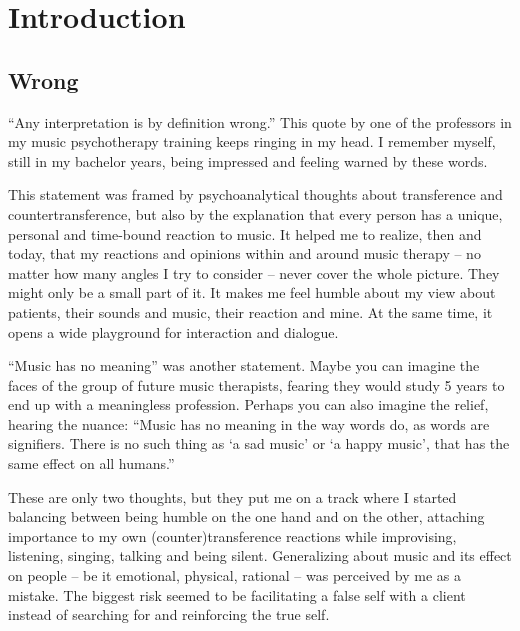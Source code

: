 \documentclass[authordate, empirical]{jote-new-article}
\author[1]{\mbox{Nele Fiers\orcid{0000-0002-8394-8598}}}
\affil[1]{Kliniek Sint-Jozef Pittem - Muze op maat}
\begin{document}
\begin{frontmatter}
  \maketitle
  \begin{abstract}
    \printabstracttext
  \end{abstract}
\end{frontmatter}


\section{Introduction}
\subsection{Wrong}

“Any interpretation is by definition wrong.” This quote by one of the professors in my music psychotherapy training keeps ringing in my head. I remember myself, still in my bachelor years, being impressed and feeling warned by these words.



This statement was framed by psychoanalytical thoughts about transference and countertransference, but also by the explanation that every person has a unique, personal and time-bound reaction to music. It helped me to realize, then and today, that my reactions and opinions within and around music therapy -- no matter how many angles I try to consider -- never cover the whole picture. They might only be a small part of it. It makes me feel humble about my view about patients, their sounds and music, their reaction and mine. At the same time, it opens a wide playground for interaction and dialogue.



“Music has no meaning” was another statement. Maybe you can imagine the faces of the group of future music therapists, fearing they would study 5 years to end up with a meaningless profession. Perhaps you can also imagine the relief, hearing the nuance: “Music has no meaning in the way words do, as words are signifiers. There is no such thing as ‘a sad music' or ‘a happy music', that has the same effect on all humans.”



These are only two thoughts, but they put me on a track where I started balancing between being humble on the one hand and on the other, attaching importance to my own (counter)transference reactions while improvising, listening, singing, talking and being silent. Generalizing about music and its effect on people -- be it emotional, physical, rational -- was perceived by me as a mistake. The biggest risk seemed to be facilitating a false self with a client instead of searching for and reinforcing the true self.
\end{document}
